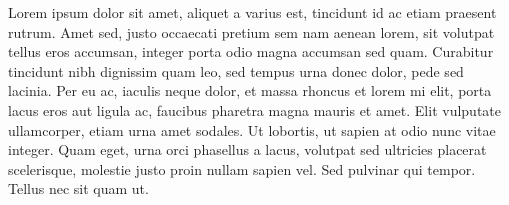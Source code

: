 \documentclass[12pt, letterpaper]{article}
\begin{document}
\vspace{0.2in}
Lorem ipsum dolor sit amet, aliquet a varius est, tincidunt id ac etiam praesent rutrum. Amet sed, justo occaecati pretium sem nam aenean lorem, sit volutpat tellus eros accumsan, integer porta odio magna accumsan sed quam. Curabitur tincidunt nibh dignissim quam leo, sed tempus urna donec dolor, pede sed lacinia. Per eu ac, iaculis neque dolor, et massa rhoncus et lorem mi elit, porta lacus eros aut ligula ac, faucibus pharetra magna mauris et amet. Elit vulputate ullamcorper, etiam urna amet sodales. Ut lobortis, ut sapien at odio nunc vitae integer. Quam eget, urna orci phasellus a lacus, volutpat sed ultricies placerat scelerisque, molestie justo proin nullam sapien vel. Sed pulvinar qui tempor. Tellus nec sit quam ut.



\end{document}
